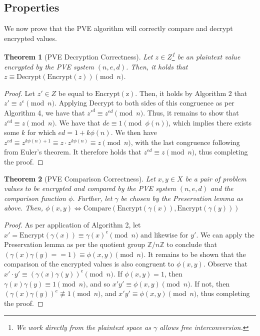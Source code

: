 \documentclass{article}
\newtheorem{theorem}{Theorem}[section]
\begin{document}
\begin{multicols}{2}
\subsection{Properties}

We now prove that the PVE algorithm will correctly compare and decrypt encrypted values.

\begin{theorem}[PVE Decryption Correctness]
    Let $z\in Z$\footnote{We work directly from the plaintext space as $\gamma$ allows free interconversion.} be an plaintext value encrypted by the PVE system $(n,e,d)$. Then, it holds that $z \equiv \mathrm{Decrypt}(\mathrm{Encrypt}(z)) \pmod{n}$.
\end{theorem}
\begin{proof}
    Let $z'\in Z$ be equal to $\mathrm{Encrypt(z)}$. Then, it holds by Algorithm 2 that $z' \equiv z^e \pmod{n}$. Applying $\mathrm{Decrypt}$ to both sides of this congruence as per Algorithm 4, we have that $z'^d \equiv z^{ed} \pmod{n}$. Thus, it remains to show that $z^{ed} \equiv z \pmod{n}$. We have that $de\equiv 1 \pmod{\phi(n)}$, which implies there exists some $k$ for which $ed = 1 + k\phi(n)$. We then have $z^{ed} \equiv z^{k\phi(n) + 1} \equiv z\cdot z^{k\phi(n)} \equiv z \pmod{n}$, with the last congruence following from Euler's theorem. It therefore holds that $z^{ed} \equiv z \pmod{n}$, thus completing the proof.
\end{proof}

\begin{theorem}[PVE Comparison Correctness]
    Let $x,y\in X$ be a pair of problem values to be encrypted and compared by the PVE system $(n,e,d)$ and the comparison function $\phi$. Further, let $\gamma$ be chosen by the Preservation lemma as above. Then, $\phi(x,y) \iff \mathrm{Compare}(\mathrm{Encrypt}(\gamma(x)), \mathrm{Encrypt}(\gamma(y)))$
\end{theorem}
\begin{proof}
    As per application of Algorithm 2, let $x' = \mathrm{Encrypt}(\gamma(x)) \equiv \gamma(x)^e \pmod{n}$ and likewise for $y'$. We can apply the Preservation lemma as per the quotient group $\mathbb{Z}/n\mathbb{Z}$ to conclude that $(\gamma(x)\gamma(y) == 1) \equiv \phi(x,y) \pmod{n}$. It remains to be shown that the comparison of the encrypted values is also congruent to $\phi(x,y)$. Observe that $x'\cdot y' \equiv (\gamma(x)\gamma(y))^e \pmod{n}$. If $\phi(x,y) = 1$, then $\gamma(x)\gamma(y) \equiv 1 \pmod{n}$, and so $x'y' \equiv \phi(x,y) \pmod{n}$. If not, then $(\gamma(x)\gamma(y))^e \not\equiv 1 \pmod{n}$, and $x'y' \equiv \phi(x,y) \pmod{n}$, thus completing the proof.
\end{proof}


\end{multicols}
\end{document}
